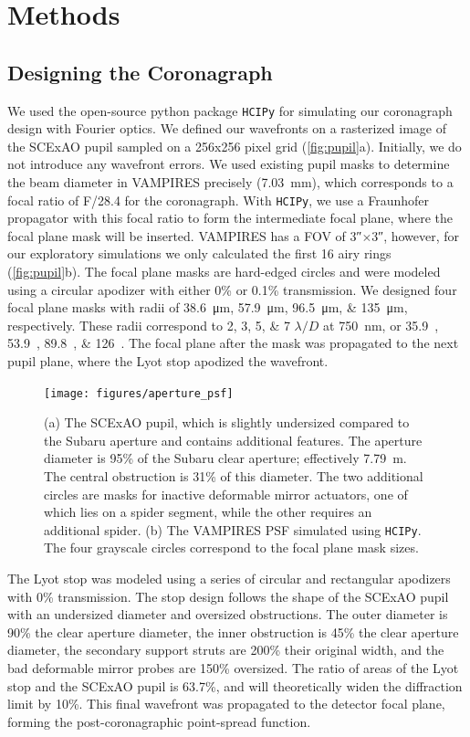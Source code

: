 \documentclass[]{spie}  %
\begin{document}
\section{Methods}\label{sec:methods}

\subsection{Designing the Coronagraph}\label{sec:design}

We used the open-source python package \texttt{HCIPy}\cite{por2018} for simulating our coronagraph design with Fourier optics. We defined our wavefronts on a rasterized image of the SCExAO pupil sampled on a 256x256 pixel grid (\autoref{fig:pupil}a). Initially, we do not introduce any wavefront errors. We used existing pupil masks to determine the beam diameter in VAMPIRES precisely (\qty{7.03}{\milli\meter}), which corresponds to a focal ratio of F/28.4 for the coronagraph. With \texttt{HCIPy}, we use a Fraunhofer propagator with this focal ratio to form the intermediate focal plane, where the focal plane mask will be inserted. VAMPIRES has a FOV of \ang{;;3}$\times$\ang{;;3}, however, for our exploratory simulations we only calculated the first 16 airy rings (\autoref{fig:pupil}b). The focal plane masks are hard-edged circles and were modeled using a circular apodizer with either 0\% or 0.1\% transmission. We designed four focal plane masks with radii of \qtylist{38.6;57.9;96.5;135}{\micro\meter}, respectively. These radii correspond to \numlist{2;3;5;7} $\lambda/D$ at \qty{750}{\nano\meter}, or \qtylist{35.9;53.9;89.8;126}{\milliarcsecond}. The focal plane after the mask was propagated to the next pupil plane, where the Lyot stop apodized the wavefront.

\begin{figure}
   \centering
   \texttt{[image: figures/aperture\_psf]}
   \caption{(a) The SCExAO pupil, which is slightly undersized compared to the Subaru aperture and contains additional features. The aperture diameter is 95\% of the Subaru clear aperture; effectively \qty{7.79}{\meter}. The central obstruction is 31\% of this diameter. The two additional circles are masks for inactive deformable mirror actuators, one of which lies on a spider segment, while the other requires an additional spider. (b) The VAMPIRES PSF simulated using \texttt{HCIPy}. The four grayscale circles correspond to the focal plane mask sizes.}\label{fig:pupil}
\end{figure}

The Lyot stop was modeled using a series of circular and rectangular apodizers with 0\% transmission. The stop design follows the shape of the SCExAO pupil with an undersized diameter and oversized obstructions. The outer diameter is 90\% the clear aperture diameter, the inner obstruction is 45\% the clear aperture diameter, the secondary support struts are 200\% their original width, and the bad deformable mirror probes are 150\% oversized. The ratio of areas of the Lyot stop and the SCExAO pupil is 63.7\%, and will theoretically widen the diffraction limit by 10\%. This final wavefront was propagated to the detector focal plane, forming the post-coronagraphic point-spread function.
\end{document}
